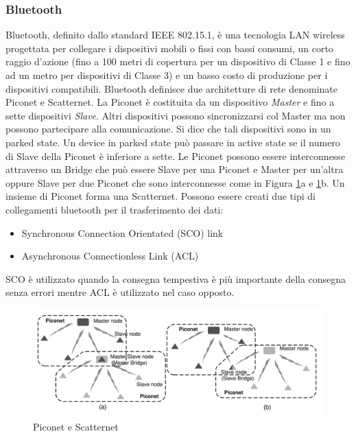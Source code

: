 \subsubsection{Bluetooth}
Bluetooth, definito dallo standard IEEE 802.15.1, è una tecnologia LAN wireless progettata per collegare i dispositivi mobili o fissi con bassi consumi, un corto raggio d'azione (fino a 100 metri di copertura per un dispositivo di Classe 1 e fino ad un metro per dispositivi di Classe 3) e un basso costo di produzione per i dispositivi compatibili. 
Bluetooth definisce due architetture di rete denominate Piconet e Scatternet. La Piconet è costituita da un dispositivo \emph{Master} e fino a sette dispositivi \emph{Slave}. Altri dispositivi possono sincronizzarsi col Master ma non possono partecipare alla comunicazione. Si dice che tali dispositivi sono in un parked state. Un device in parked state può passare in active state se il numero di Slave della Piconet è inferiore a sette. Le Piconet possono essere interconnesse attraverso un Bridge che può essere Slave per una Piconet e Master per un'altra oppure Slave per due Piconet che sono interconnesse come in Figura \ref{fig:bt}a e \ref{fig:bt}b. Un insieme di Piconet forma una Scatternet.\newline
Possono essere creati due tipi di collegamenti bluetooth per il trasferimento dei dati:
\begin{itemize}
		\item Synchronous Connection Orientated (SCO) link
		\item Asynchronous Connectionless Link (ACL)
\end{itemize}
SCO è utilizzato quando la consegna tempestiva è più importante della consegna senza errori mentre ACL è utilizzato nel caso opposto.
\\
\begin{figure}[h]
	\centering
	\includegraphics[scale=0.350]{imgs/bt.png}
	\caption{Piconet e Scatternet} \label{fig:bt}
\end{figure}
